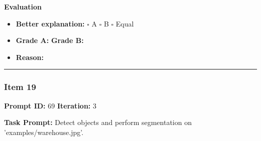 \documentclass[11pt]{article}
\begin{document}
\textbf{Evaluation}
\begin{itemize}
    \item \textbf{Better explanation:} \hspace{1em} $\square$ A \hspace{1em} $\square$ B \hspace{1em} $\square$ Equal
    \item \textbf{Grade A:} \underline{\hspace{2cm}} \hspace{1em} \textbf{Grade B:} \underline{\hspace{2cm}}
    \item \textbf{Reason:} \\[4.5em]
\end{itemize}

\vspace{1em}
\hrule
\vspace{1em}


\subsubsection*{Item 19}
\textbf{Prompt ID:} 69 \hfill \textbf{Iteration:} 3

\textbf{Task Prompt:} Detect objects and perform segmentation on 'examples/warehouse.jpg'.
\end{document}
